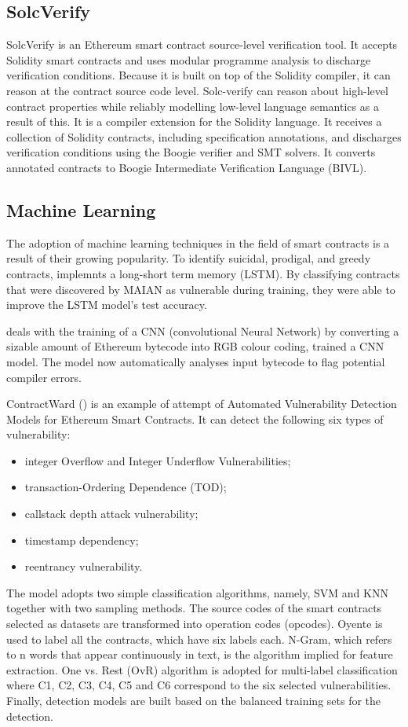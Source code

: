 \documentclass[a4paper,sigconf, language=french,
language=german, language=spanish, language=english]{acmart}
\begin{document}
\subsection{SolcVerify} 
SolcVerify is an Ethereum smart contract source-level verification tool.
It accepts Solidity smart contracts and uses modular programme analysis to discharge verification conditions.
Because it is built on top of the Solidity compiler, it can reason at the contract source code level.
Solc-verify can reason about high-level contract properties while reliably modelling low-level language semantics as a result of this.
It is a compiler extension for the Solidity language.
It receives a collection of Solidity contracts, including specification annotations, and discharges verification conditions using the Boogie verifier and SMT solvers.
It converts annotated contracts to Boogie Intermediate Verification Language (BIVL).
\subsection{Machine Learning}
The adoption of machine learning techniques in the field of smart contracts is a result of their growing popularity. To identify suicidal, prodigal, and greedy contracts, \cite{MLAnalysis} implemnts a long-short term memory (LSTM).
By classifying contracts that were discovered by MAIAN as vulnerable during training, they were able to improve the LSTM model's test accuracy. 

\cite{CNNML} deals with the training of a CNN (convolutional Neural Network) by converting a sizable amount of Ethereum bytecode into RGB colour coding,  trained a CNN model. The model now automatically analyses input bytecode to flag potential compiler errors. 

ContractWard (\cite{MLtool}) is an example of attempt of Automated Vulnerability Detection Models for Ethereum Smart Contracts. It can detect the following six types of vulnerability: 
\begin{itemize}
    \item integer Overflow and Integer Underflow Vulnerabilities;
    \item transaction-Ordering Dependence (TOD);
    \item callstack depth attack vulnerability;
    \item timestamp dependency;
    \item reentrancy vulnerability.
\end{itemize}

The model adopts two simple classification algorithms, namely, SVM and KNN together with two sampling methods.
The source codes of the smart contracts selected as datasets are transformed into operation codes (opcodes). Oyente is used to label all the contracts, which have six labels each.  N-Gram, which refers to n words that appear
continuously in text, is the algorithm implied for feature extraction.
One vs. Rest (OvR) algorithm is adopted for multi-label classification where
C1, C2, C3, C4, C5 and C6 correspond to the six selected vulnerabilities. 
Finally, detection models are built based on the balanced
training sets for the detection.
\end{document}
